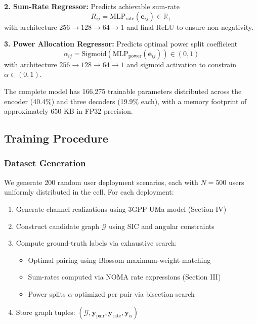\textbf{2. Sum-Rate Regressor:} Predicts achievable sum-rate
\begin{equation}
R_{ij} = \text{MLP}_{\text{rate}}(\mathbf{e}_{ij}) \in \mathbb{R}_+
\end{equation}
with architecture $256 \to 128 \to 64 \to 1$ and final ReLU to ensure non-negativity.

\textbf{3. Power Allocation Regressor:} Predicts optimal power split coefficient
\begin{equation}
\alpha_{ij} = \text{Sigmoid}\left( \text{MLP}_{\text{power}}(\mathbf{e}_{ij}) \right) \in (0, 1)
\end{equation}
with architecture $256 \to 128 \to 64 \to 1$ and sigmoid activation to constrain $\alpha \in (0, 1)$.

The complete model has 166,275 trainable parameters distributed across the encoder (40.4\%) and three decoders (19.9\% each), with a memory footprint of approximately 650 KB in FP32 precision.

\subsection{Training Procedure}

\subsubsection{Dataset Generation}

We generate 200 random user deployment scenarios, each with $N = 500$ users uniformly distributed in the cell. For each deployment:

\begin{enumerate}
    \item Generate channel realizations using 3GPP UMa model (Section IV)
    \item Construct candidate graph $\mathcal{G}$ using SIC and angular constraints
    \item Compute ground-truth labels via exhaustive search:
    \begin{itemize}
        \item Optimal pairing using Blossom maximum-weight matching
        \item Sum-rates computed via NOMA rate expressions (Section III)
        \item Power splits $\alpha$ optimized per pair via bisection search
    \end{itemize}
    \item Store graph tuples: $(\mathcal{G}, \mathbf{y}_{\text{pair}}, \mathbf{y}_{\text{rate}}, \mathbf{y}_{\alpha})$
\end{enumerate}

